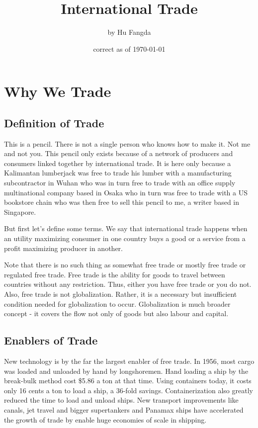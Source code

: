 \RequirePackage{../../dominatrix}

\title{International Trade}
\author{\large by Hu Fangda}
\date{\small correct as of \today}

\maketitle
\tableofcontents
\section{Why We Trade}
\subsection{Definition of Trade}
This is a pencil. There is not a single person who knows how to make it. Not me and not you. This pencil only exists because of a network of producers and consumers linked together by international trade. It is here only because a Kalimantan lumberjack was free to trade his lumber with a manufacturing subcontractor in Wuhan who was in turn free to trade with an office supply multinational company based in Osaka who in turn was free to trade with a US bookstore chain who was then free to sell this pencil to me, a writer based in Singapore.

But first let's define some terms. We say that international trade happens when an utility maximizing consumer in one country buys a good or a service from a profit maximizing producer in another.

Note that there is no such thing as somewhat free trade or mostly free trade or regulated free trade. Free trade is the ability for goods to travel between countries without any restriction. Thus, either you have free trade or you do not. Also, free trade is not globalization. Rather, it is a necessary but insufficient condition needed for globalization to occur. Globalization is much broader concept - it covers the flow not only of goods but also labour and capital.
\subsection{Enablers of Trade}
New technology is by the far the largest enabler of free trade. In 1956, most cargo was loaded and unloaded by hand by longshoremen. Hand loading a ship by the break-bulk method cost \$5.86 a ton at that time. Using containers today, it costs only 16 cents a ton to load a ship, a 36-fold savings. Containerization also greatly reduced the time to load and unload ships. New transport improvements like canals, jet travel and bigger supertankers and Panamax ships have accelerated the growth of trade by enable huge economies of scale in shipping.

